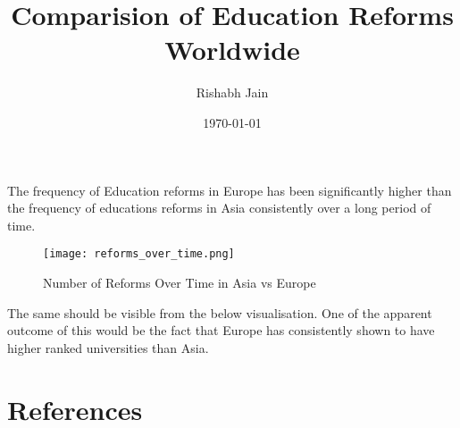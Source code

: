 \documentclass{article}
\begin{document}
\title{Comparision of Education Reforms Worldwide }
\author{Rishabh Jain}
\date{\today}
\maketitle


\begin{singlecolumn}{0}
 The frequency of Education reforms in Europe has been significantly higher than the frequency of educations reforms in Asia consistently over a long period of time. 
\begin{figure}[h]
\centering
\texttt{[image: reforms\_over\_time.png]}
\caption{Number of Reforms Over Time in Asia vs Europe}
\label{fig:reforms}
\end{figure}
 The same should be visible from the below visualisation.
 One of the apparent outcome of this would be the fact that Europe has consistently shown to have higher ranked universities than Asia.
 
\end{singlecolumn}


\section*{References}
\lipsum[11]
\end{document}
